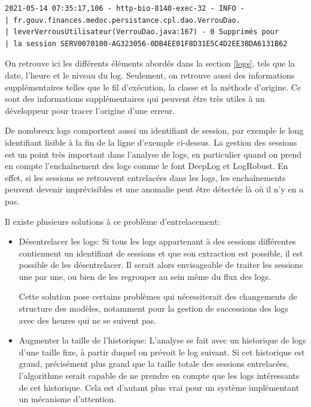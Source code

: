 \documentclass[openany, 11pt]{memoir}
\begin{document}
\begin{lstlisting}
2021-05-14 07:35:17,106 - http-bio-8140-exec-32 - INFO -
| fr.gouv.finances.medoc.persistance.cpl.dao.VerrouDao.
| leverVerrousUtilisateur(VerrouDao.java:167) - 0 Supprimés pour
| la session SERV0070100-AG323056-0DB4EE01F8D31E5C4D2EE3BDA6131B62
\end{lstlisting}

On retrouve ici les différents éléments abordés dans la section \ref{logs}, tels que la date, l'heure et le niveau du \gls{log}. Seulement, on retrouve aussi des informations supplémentaires telles que le fil d'exécution, la classe et la méthode d'origine. Ce sont des informations supplémentaires qui peuvent être très utiles à un développeur pour tracer l'origine d'une erreur.

\bigskip
De nombreux \glspl{log} comportent aussi un identifiant de session, par exemple le long identifiant lisible à la fin de la ligne d'exemple ci-dessus. La gestion des sessions est un point très important dans l'analyse de logs, en particulier quand on prend en compte l'enchaînement des logs comme le font DeepLog et LogRobust. En effet, si les sessions se retrouvent entrelacées dans les logs, les enchaînements peuvent devenir imprévisibles et une anomalie peut être détectée là où il n'y en a pas.

Il existe plusieurs solutions à ce problème d'entrelacement:
\begin{itemize}
	\item Désentrelacer les \glspl{log}: Si tous les logs appartenant à des sessions différentes contiennent un identifiant de sessions et que son extraction est possible, il est possible de les désentrelacer. Il serait alors envisageable de traiter les sessions une par une, ou bien de les regrouper au sein même du flux des logs.

Cette solution pose certains problèmes qui nécessiterait des changements de structure des modèles, notamment pour la gestion de successions des \glspl{log} avec des heures qui ne se suivent pas.

	\item Augmenter la taille de l'historique: L'analyse se fait avec un historique de \glspl{log} d'une taille fixe, à partir duquel on prévoit le log suivant. Si cet historique est grand, précisément plus grand que la taille totale des sessions entrelacées, l'algorithme serait capable de ne prendre en compte que les logs intéressants de cet historique. Cela est d'autant plus vrai pour un système implémentant un mécanisme d'attention.
\end{itemize}
\end{document}
